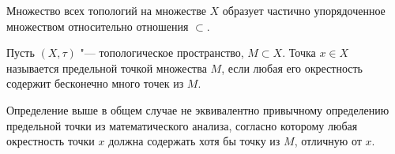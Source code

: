 \begin{note}
	Множество всех топологий на множестве $X$ образует частично упорядоченное множеством относительно отношения $\subset$.
\end{note}

\begin{definition}
	Пусть $(X, \tau)$ "--- топологическое пространство, $M \subset X$. Точка ${x \in X}$ называется предельной точкой множества $M$, если любая его окрестность содержит бесконечно много точек из $M$.
\end{definition}

\begin{note}
	Определение выше в общем случае не эквивалентно привычному определению предельной точки из математического анализа, согласно которому любая окрестность точки $x$ должна содержать хотя бы точку из $M$, отличную от $x$.
\end{note}